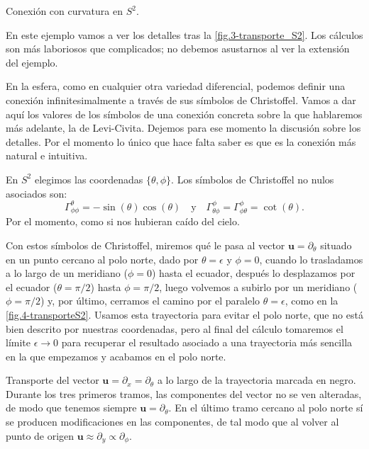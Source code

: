\begin{example}
    {Conexión con curvatura en \(S^2\).
    \label{ej.4-conexión_esfera}}

    En este ejemplo vamos a ver los detalles tras la \cref{fig.3-transporte_S2}. Los cálculos son más laboriosos que complicados; no debemos asustarnos al ver la extensión del ejemplo.

    En la esfera, como en cualquier otra variedad diferencial, podemos definir una conexión infinitesimalmente a través de sus símbolos de Christoffel. Vamos a dar aquí los valores de los símbolos de una conexión concreta sobre la que hablaremos más adelante, la de Levi-Civita. Dejemos para ese momento la discusión sobre los detalles. Por el momento lo único que hace falta saber es que es la conexión más natural e intuitiva.

    En \(S^2\) elegimos las coordenadas \(\{\theta, \phi\}\). Los símbolos de Christoffel no nulos asociados son:
    \begin{equation*}
        \Gamma^{\theta}_{\phi\phi} = -\sin(\theta)\cos(\theta)\quad\text{y}\quad\Gamma^{\phi}_{\theta\phi} = \Gamma^{\phi}_{\phi\theta} = \cot(\theta).
    \end{equation*}
    Por el momento, como si nos hubieran caído del cielo.

    Con estos símbolos de Christoffel, miremos qué le pasa al vector \(\mathbf{u} = \partial_\theta\) situado en un punto cercano al polo norte, dado por \(\theta=\epsilon\) y \(\phi = 0\), cuando lo trasladamos a lo largo de un meridiano (\(\phi = 0\)) hasta el ecuador, después lo desplazamos por el ecuador (\(\theta = \pi/2\)) hasta \(\phi=\pi/2\), luego volvemos a subirlo por un meridiano (\(\phi = \pi/2\)) y, por último, cerramos el camino por el paralelo \(\theta=\epsilon\), como en la \cref{fig.4-transporteS2}. Usamos esta trayectoria para evitar el polo norte, que no está bien descrito por nuestras coordenadas, pero al final del cálculo tomaremos el límite \(\epsilon\rightarrow0\) para recuperar el resultado asociado a una trayectoria más sencilla en la que empezamos y acabamos en el polo norte.

    \begin{figbox}
        {Transporte del vector \(\mathbf{u} = \partial_x = \partial_\theta\) a lo largo de la trayectoria marcada en negro. Durante los tres primeros tramos, las componentes del vector no se ven alteradas, de modo que tenemos siempre \(\mathbf{u} = \partial_\theta\). En el último tramo cercano al polo norte sí se producen modificaciones en las componentes, de tal modo que al volver al punto de origen \(\mathbf{u} \approx \partial_y \propto \partial_\phi\).
        \label{fig.4-transporteS2}}
        
    \end{figbox}
    

\end{example}
